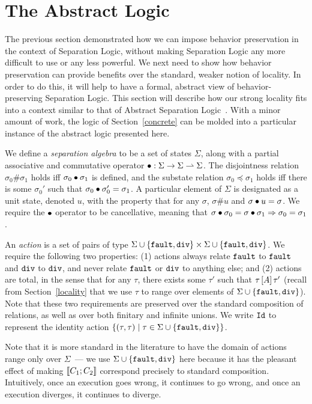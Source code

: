\section{The Abstract Logic}
\label{abslogic}

The previous section demonstrated how we can impose behavior preservation in
the context of Separation Logic, without making Separation Logic any more
difficult to use or any less powerful. We next need to show how behavior
preservation can provide benefits over the standard, weaker notion of locality.
In order to do this, it will help to have a formal, abstract view of
behavior-preserving Separation Logic. This section will describe how 
our strong locality fits into a context similar to that of 
Abstract Separation Logic~\cite{coy07}. With a minor amount of work, the 
logic of Section~\ref{concrete} can be molded into a particular instance 
of the abstract logic presented here.

We define a \emph{separation algebra} to be a set of states $\Sigma$, along with a partial associative
and commutative operator $\bullet : \Sigma \to \Sigma \rightharpoonup \Sigma$. The disjointness relation $\sigma_0 \# \sigma_1$ holds iff 
$\sigma_0 \bullet \sigma_1$ is defined, and the substate relation $\sigma_0 \preceq \sigma_1$ holds iff there is some
$\sigma_0'$ such that $\sigma_0 \bullet \sigma_0' = \sigma_1$. A particular element of $\Sigma$ is 
designated as a unit state, denoted $u$, with the property that for any $\sigma$, $\sigma \# u$ and $\sigma \bullet u = \sigma$. We require
the $\bullet$ operator to be cancellative, meaning that $\sigma \bullet \sigma_0 = \sigma \bullet \sigma_1 \Rightarrow \sigma_0 = \sigma_1$.

An \emph{action} is a set of pairs of type $\Sigma \cup \{\text{\tt{fault}},\texttt{div}\} \times \Sigma \cup \{\text{\tt{fault}},\texttt{div}\}$.
We require the following
two properties: (1) actions always relate $\text{\tt{fault}}$ to $\text{\tt{fault}}$ and $\texttt{div}$ to $\texttt{div}$, and never relate $\text{\tt{fault}}$ or $\texttt{div}$ to 
anything else; and (2) actions are total, in the sense that for any $\tau$, there exists some $\tau'$ such that $\tau \left[A\right] \tau'$
(recall from Section~\ref{locality} that we use $\tau$ to range over elements of $\Sigma \cup \{\text{\tt{fault}},\texttt{div}\}$). 
Note that these two requirements are preserved over the standard composition of relations, as well as over both finitary and infinite unions.
We write $\text{\tt{Id}}$ to represent the identity action $\{(\tau,\tau) \hspace{1mm} | \hspace{1mm} \tau \in \Sigma \cup \{\text{\tt{fault}},\texttt{div}\}\}$.

Note that it is more standard in the literature to have the domain of actions
range only over $\Sigma$~--- we use $\Sigma \cup \{\text{\tt{fault}},\texttt{div}\}$ here because it has the pleasant effect of making $\llbracket C_1;C_2 \rrbracket$
correspond precisely to standard composition. Intuitively, once an execution goes wrong, it continues to go wrong, and once an execution
diverges, it continues to diverge.

